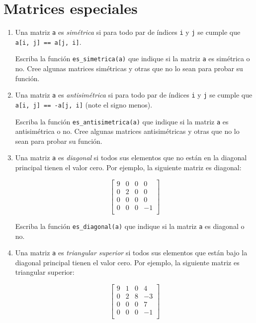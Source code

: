 \section{Matrices especiales}

\begin{enumerate}
\item
  Una matriz \lstinline!a! es \emph{simétrica} si para todo par de
  índices \lstinline!i! y \lstinline!j! se cumple que
  \lstinline!a[i, j] == a[j, i]!.

  Escriba la función \lstinline!es_simetrica(a)! que indique si la
  matriz \lstinline!a! es simétrica o no.
  Cree algunas matrices simétricas y otras que no lo sean para probar su
  función.

\item
  Una matriz \lstinline!a! es \emph{antisimétrica} si para todo par de
  índices \lstinline!i! y \lstinline!j! se cumple que
  \lstinline!a[i, j] == -a[j, i]! (note el signo menos).

  Escriba la función \lstinline!es_antisimetrica(a)! que indique si la
  matriz \lstinline!a! es antisimétrica o no.
  Cree algunas matrices antisimétricas y otras que no lo sean para
  probar su función.

\item
  Una matriz \lstinline!a! es \emph{diagonal} si todos sus elementos
  que no están en la diagonal principal tienen el valor cero. Por
  ejemplo, la siguiente matriz es diagonal:

  \[\begin{bmatrix}
  9 & 0 & 0 & 0 \\
  0 & 2 & 0 & 0 \\
  0 & 0 & 0 & 0 \\
  0 & 0 & 0 & -1 \\
  \end{bmatrix}\]

  Escriba la función \lstinline!es_diagonal(a)! que indique si la matriz
  \lstinline!a! es diagonal o no.

\item
  Una matriz \lstinline!a! es \emph{triangular superior} si todos sus
  elementos que están bajo la diagonal principal tienen el valor cero.
  Por ejemplo, la siguiente matriz es triangular superior:

  \[\begin{bmatrix}
  9 & 1 & 0 & 4 \\
  0 & 2 & 8 & -3 \\
  0 & 0 & 0 & 7 \\
  0 & 0 & 0 & -1 \\
  \end{bmatrix}\]


\end{enumerate}
